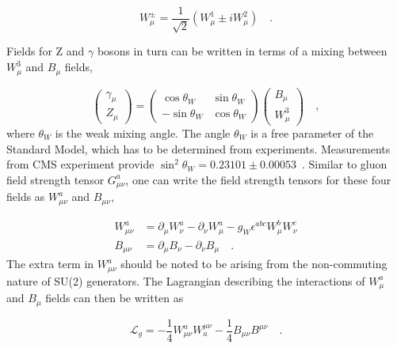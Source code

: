 \begin{equation}
    W^{\pm}_{\mu} = \frac{1}{\sqrt{2}} \left( W^{1}_{\mu} \pm i W^{2}_{\mu} \right) \quad .
\end{equation}

Fields for $\textrm{Z}$ and $\gamma$ bosons in turn can be written in terms of a mixing between $W_{\mu}^{3}$ and $B_{\mu}$ fields,

\begin{equation}
    \begin{pmatrix}
        \gamma_{\mu} \\ Z_{\mu}
    \end{pmatrix}
    = 
    \begin{pmatrix}
        \cos \theta_{W} & \sin \theta_{W} \\ 
        - \sin \theta_{W} & \cos \theta_{W}
    \end{pmatrix}
    \begin{pmatrix}
        B_{\mu} \\ W^{3}_{\mu}
    \end{pmatrix} \quad ,
    \label{eq:z_and_gamma_mixing}
\end{equation}
where $\theta_{W}$ is the weak mixing angle. The angle $\theta_{W}$ is a free parameter of the Standard Model, which has to be determined
from experiments. Measurements from CMS experiment provide  
$\sin^2 \theta_{W} = 0.23101 \pm 0.00053$~\cite{CMS:WeakMixingAngleMeasurement}.
Similar to gluon field strength tensor $G_{\mu\nu}^{a}$, one can write the field strength tensors for these four fields 
as $W_{\mu\nu}^{a}$ and $B_{\mu\nu}$,

\begin{equation}
    \begin{split}
        W_{\mu\nu}^{a} &= \partial_{\mu} W_{\nu}^{a} - \partial_{\nu} W_{\mu}^{a} - g_{W} \epsilon^{abc} W_{\mu}^{b} W_{\nu}^{c} \\
        B_{\mu\nu}     &= \partial_{\mu} B_{\nu}     - \partial_{\nu} B_{\mu} \quad .
    \end{split}
    \label{eq:field_strength_ew}
\end{equation}
The extra term in $W_{\mu\nu}^{a}$ should be noted to be arising from the non-commuting nature of SU(2) generators.
The Lagrangian describing the interactions of $W_{\mu}^{a}$ and $B_{\mu}$ fields can then be written as

\begin{equation}
    \mathcal{L}_{g} = -\frac{1}{4} W_{\mu\nu}^{a} W^{\mu\nu}_{a} -\frac{1}{4} B_{\mu\nu} B^{\mu\nu} \quad .
    \label{eq:lagrangian_kinetic_term}
\end{equation}

